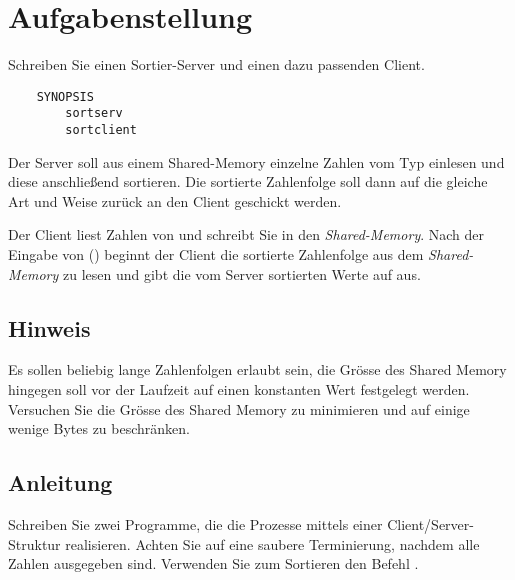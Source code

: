 




\section*{Aufgabenstellung}

Schreiben Sie einen Sortier-Server und einen dazu passenden Client.
\begin{verbatim}
    SYNOPSIS
        sortserv
        sortclient
\end{verbatim}
Der Server soll aus einem Shared-Memory einzelne Zahlen vom Typ  einlesen und
diese anschließend sortieren. Die sortierte Zahlenfolge soll dann auf die gleiche Art und
Weise zur\"uck an den Client geschickt werden.

Der Client liest Zahlen von  und schreibt Sie in den \emph{Shared-Memory}.
Nach der Eingabe von  () beginnt der Client die sortierte Zahlenfolge aus dem
\emph{Shared-Memory} zu lesen und gibt die vom Server sortierten Werte auf  aus.

\subsection*{Hinweis}
Es sollen beliebig lange Zahlenfolgen erlaubt sein, die Gr\"osse des Shared Memory hingegen soll vor der Laufzeit auf einen konstanten Wert festgelegt werden. Versuchen Sie die Gr\"osse des Shared Memory zu minimieren und auf einige wenige Bytes zu beschr\"anken.

\subsection*{Anleitung}
Schreiben Sie zwei Programme, die die Prozesse mittels einer Client/Server-Struktur realisieren. Achten Sie auf eine saubere Terminierung, nachdem alle Zahlen ausgegeben sind. Verwenden Sie zum Sortieren den Befehl .

\osueguidelinesthree


